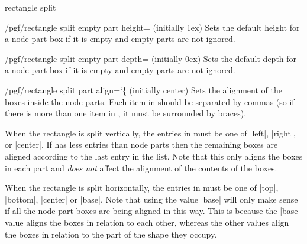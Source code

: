 \begin{shape}{rectangle split}
  \begin{key}{/pgf/rectangle split empty part height= (initially 1ex)}
    Sets the default height for a node part box if it is empty and
    empty parts are not ignored.
  \end{key}

  \begin{key}{/pgf/rectangle split empty part depth= (initially 0ex)}
    Sets the default depth for a node part box if it is empty and
    empty parts are not ignored.
  \end{key}

  \begin{key}{/pgf/rectangle split part align={\ttfamily\char`\{} (initially center)}
  	Sets the alignment of the boxes inside the node parts.
  	Each item in  should be
  	separated by commas (so if there is more than one item in
  	, it must be surrounded by braces).
  	
  	When the rectangle is split vertically, the entries in 
  	must be one of |left|, |right|, or |center|. If  has less
  	entries than node parts then the remaining boxes are aligned
  	according to the last entry in the list.
    Note that this only aligns the boxes in each part and \emph{does not}
    affect the alignment of the contents of the boxes.

\begin{codeexample}[]
\def\x{one \nodepart{two} 2 \nodepart{three} three \nodepart{four} 4}
\end{codeexample}

 	When the rectangle is split horizontally, the entries in 
	must be one of |top|, |bottom|, |center| or |base|. Note that using
	the value |base| will only make sense if all the node part boxes are
	being	aligned in this way. This is because the |base| value aligns
	the boxes in relation to each other, whereas the other values align
	the boxes in relation to the part of the shape they occupy.


\begin{codeexample}[]
\def\x{\Large w\nodepart{two}x\nodepart{three}\Huge y\nodepart{four}\tiny z}
\end{codeexample}


\end{key}
\end{shape}
